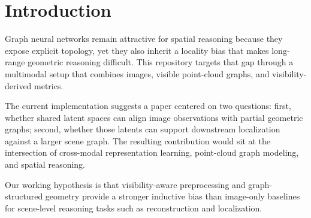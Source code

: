 \section{Introduction}

Graph neural networks remain attractive for spatial reasoning because they expose explicit topology, yet they also inherit a locality bias that makes long-range geometric reasoning difficult. This repository targets that gap through a multimodal setup that combines images, visible point-cloud graphs, and visibility-derived metrics.

The current implementation suggests a paper centered on two questions: first, whether shared latent spaces can align image observations with partial geometric graphs; second, whether those latents can support downstream localization against a larger scene graph. The resulting contribution would sit at the intersection of cross-modal representation learning, point-cloud graph modeling, and spatial reasoning.

Our working hypothesis is that visibility-aware preprocessing and graph-structured geometry provide a stronger inductive bias than image-only baselines for scene-level reasoning tasks such as reconstruction and localization.
